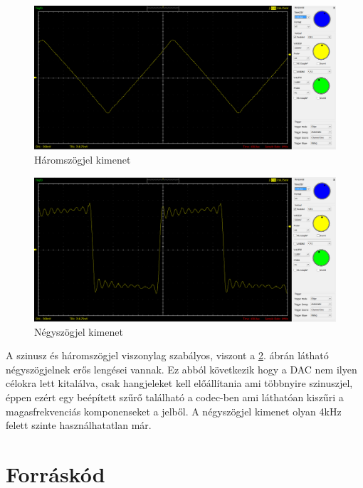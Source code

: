 \documentclass[a4paper,11pt]{article}
\begin{document}
\begin{figure}[H]
	\begin{center}
		\includegraphics[scale=0.25]{scope_tri.png}	
	\end{center}
	\caption{Háromszögjel kimenet}
	\label{a:triout}
\end{figure}

\begin{figure}[H]
	\begin{center}
		\includegraphics[scale=0.25]{scope_sqr.png}	
	\end{center}
	\caption{Négyszögjel kimenet}
	\label{a:sqrout}
\end{figure}

A szinusz és háromszögjel viszonylag szabályos, viszont a \ref{a:sqrout}. ábrán látható négyszögjelnek erős lengései vannak. Ez abból következik hogy a DAC nem ilyen célokra lett kitalálva, csak hangjeleket kell előállítania ami többnyire szinuszjel, éppen ezért egy beépített szűrő található a codec-ben ami láthatóan kiszűri a magasfrekvenciás komponenseket a jelből. A négyszögjel kimenet olyan 4kHz felett szinte használhatatlan már. 

\section{Forráskód}
\end{document}
